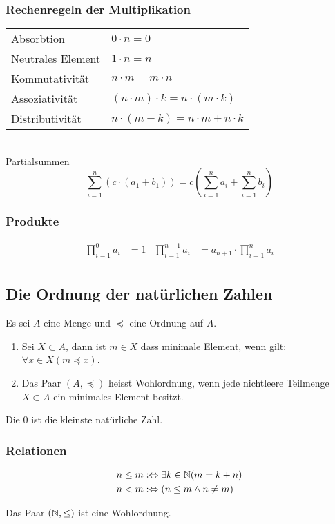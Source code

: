 \subsubsection{Rechenregeln der Multiplikation}
\settowidth{\MyLenA}{Neutrales Element~~}
\begin{tabular}{@{}p{\the\MyLenA}%
				@{}p{}}
	Absorbtion				& $0 \cdot n = 0$\\
	Neutrales Element 		& $1 \cdot n = n$\\
	Kommutativität			& $n \cdot m = m \cdot n$\\
	Assoziativität			& $(n \cdot m) \cdot k = n \cdot (m \cdot k)$\\
	Distributivität			& $n \cdot (m + k) = n \cdot m + n \cdot k$\\
\end{tabular}\\
Partialsummen
\begin{equation*}
	\sum_{i=1}^n (c \cdot(a_1 + b_1)) = c \left (\sum_{i=1}^n a_i + \sum_{i=1}^n b_i \right )
\end{equation*}

\subsubsection{Produkte}
\begin{align*}
	\prod_{i=1}^0 a_i& = 1&
	\prod_{i=1}^{n + 1} a_i& = a_{n+1} \cdot \prod_{i=1}^n a_i\\
\end{align*}

\subsection{Die Ordnung der natürlichen Zahlen}
Es sei $A$ eine Menge und $\preceq$ eine Ordnung auf $A$.
\begin{enumerate}
	\item Sei $X \subset A$, dann ist $m \in X$ dass minimale Element, wenn gilt: $\forall x \in X (m \preceq x)$.
	\item Das Paar $(A, \preceq)$ heisst Wohlordnung, wenn jede nichtleere Teilmenge $X \subset A$ ein minimales Element besitzt.
\end{enumerate}
Die 0 ist die kleinste natürliche Zahl.

\subsubsection{Relationen}
\settowidth{\MyLenA}{$a \leq b$ ~~}
\begin{align*}
	n \leq m & :\Leftrightarrow \exists k \in \mathbb{N} (m = k + n)\\
	n < m & :\Leftrightarrow (n \leq m \wedge n \neq m)\\
\end{align*}
\begin{satz}
Das Paar $(\mathbb{N}, \leq)$ ist eine Wohlordnung. 
\end{satz}

